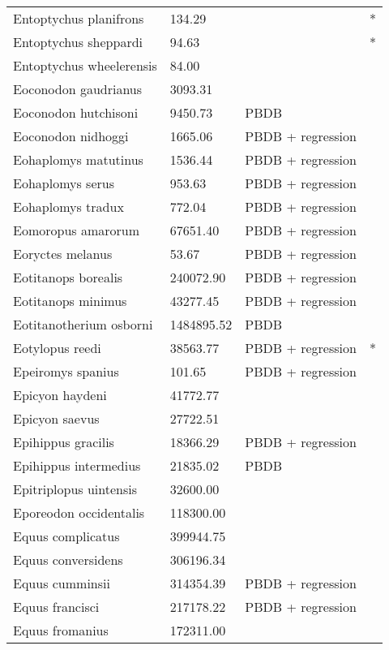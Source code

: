 \documentclass{article}
\begin{document}
\begin{center}
\begin{longtable}{p{} p{} p{} p{}}
    Entoptychus planifrons & 134.29 & \cite{Tomiya2013} & * \\ 
    Entoptychus sheppardi & 94.63 & \cite{Tomiya2013} & * \\ 
    Entoptychus wheelerensis & 84.00 & \cite{McKenna2011} &  \\ 
    Eoconodon gaudrianus & 3093.31 & \cite{Zonneveld2003} &  \\ 
    Eoconodon hutchisoni & 9450.73 & PBDB &  \\ 
    Eoconodon nidhoggi & 1665.06 & PBDB + regression &  \\ 
    Eohaplomys matutinus & 1536.44 & PBDB + regression &  \\ 
    Eohaplomys serus & 953.63 & PBDB + regression &  \\ 
    Eohaplomys tradux & 772.04 & PBDB + regression &  \\ 
    Eomoropus amarorum & 67651.40 & PBDB + regression &  \\ 
    Eoryctes melanus & 53.67 & PBDB + regression &  \\ 
    Eotitanops borealis & 240072.90 & PBDB + regression &  \\ 
    Eotitanops minimus & 43277.45 & PBDB + regression &  \\ 
    Eotitanotherium osborni & 1484895.52 & PBDB &  \\ 
    Eotylopus reedi & 38563.77 & PBDB + regression & * \\ 
    Epeiromys spanius & 101.65 & PBDB + regression &  \\ 
    Epicyon haydeni & 41772.77 & \cite{Tomiya2013} &  \\ 
    Epicyon saevus & 27722.51 & \cite{Tomiya2013} &  \\ 
    Epihippus gracilis & 18366.29 & PBDB + regression &  \\ 
    Epihippus intermedius & 21835.02 & PBDB &  \\ 
    Epitriplopus uintensis & 32600.00 & \cite{MacFadden1986} &  \\ 
    Eporeodon occidentalis & 118300.00 & \cite{McKenna2011} &  \\ 
    Equus complicatus & 399944.75 & \cite{Smith2004} &  \\ 
    Equus conversidens & 306196.34 & \cite{Smith2004} &  \\ 
    Equus cumminsii & 314354.39 & PBDB + regression &  \\ 
    Equus francisci & 217178.22 & PBDB + regression &  \\ 
    Equus fromanius & 172311.00 & \cite{McKenna2011} &  \\ 

\end{longtable}
\end{center}
\end{document}
